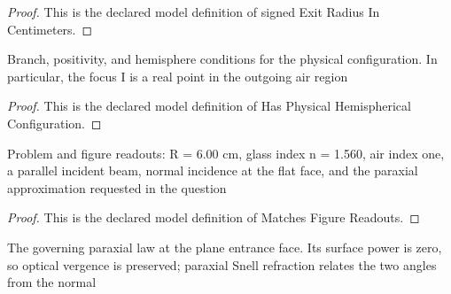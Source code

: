 \begin{proof}
  This is the declared model definition of signed Exit Radius In Centimeters.
\end{proof}
\begin{definition}
  \label{def:physics:phyx-mini-0033:phyxminiproblems-problemphyxmini0033-hasphysicalhemisphericalconfiguration}
  Branch, positivity, and hemisphere conditions for the physical configuration. In particular, the focus I is a real point in the outgoing air region
\end{definition}
\begin{proof}
  This is the declared model definition of Has Physical Hemispherical Configuration.
\end{proof}
\begin{definition}
  \label{def:physics:phyx-mini-0033:phyxminiproblems-problemphyxmini0033-matchesfigurereadouts}
  Problem and figure readouts: R = 6.00 cm, glass index n = 1.560, air index one, a parallel incident beam, normal incidence at the flat face, and the paraxial approximation requested in the question
\end{definition}
\begin{proof}
  This is the declared model definition of Matches Figure Readouts.
\end{proof}
\begin{definition}
  \label{def:physics:phyx-mini-0033:phyxminiproblems-problemphyxmini0033-satisfiesflatfaceparaxialrefraction}
  The governing paraxial law at the plane entrance face. Its surface power is zero, so optical vergence is preserved; paraxial Snell refraction relates the two angles from the normal
\end{definition}
